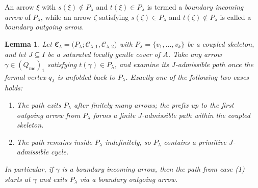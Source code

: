 \documentclass[11pt]{amsart}
\numberwithin{equation}{section}
\newtheorem{lemma}[theorem]{Lemma}
\theoremstyle{definition}
\begin{document}
An arrow \(\xi\) with \(s(\xi)\notin P_\lambda\) and \(t(\xi)\in P_\lambda\) is termed a \emph{boundary incoming arrow} of \(P_\lambda\), while an arrow \(\zeta\) satisfying \(s(\zeta)\in P_\lambda\) and \(t(\zeta)\notin P_\lambda\) is called a \emph{boundary outgoing arrow}. 
\begin{lemma}\label{lem:cou_ske_con}
Let \(\mathfrak C_\lambda = \bigl(P_\lambda;\mathcal C_{\lambda,1},\mathcal C_{\lambda,2}\bigr)\) with \(P_\lambda = \{v_1,\dots,v_k\}\) be a coupled skeleton, and let \(J\subseteq I\) be a saturated locally gentle cover of \(A\). Take any arrow \(\gamma\in (Q_{\mathrm{mc}})_1\) satisfying \(t(\gamma)\in P_\lambda\), and examine its \(J\)-admissible path once the formal vertex \(q_\lambda\) is unfolded back to \(P_\lambda\). Exactly one of the following two cases holds:
\begin{enumerate}[label=\textup{(\arabic*)}]
  \item The path exits \(P_\lambda\) after finitely many arrows; the prefix up to the first outgoing arrow from \(P_\lambda\) forms a finite \(J\)-admissible path within the coupled skeleton.
  \item The path remains inside \(P_\lambda\) indefinitely, so \(P_\lambda\) contains a primitive \(J\)-admissible cycle.
\end{enumerate}
In particular, if \(\gamma\) is a boundary incoming arrow, then the path from case (1) starts at \(\gamma\) and exits \(P_\lambda\) via a boundary outgoing arrow.
\end{lemma}
\end{document}
